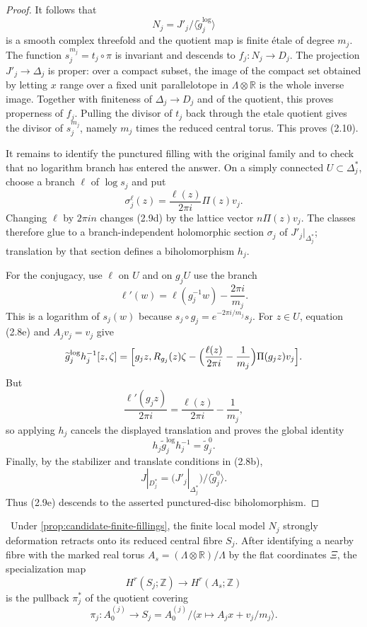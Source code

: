 \begin{proof}
It follows that
\[
 N_j=J'_j/\langle\widetilde g_j^{\log}\rangle
\]
is a smooth complex threefold and the quotient map is finite \'etale of
degree \(m_j\).  The function \(s_j^{m_j}=t_j\circ\pi\) is invariant and
descends to \(f_j:N_j\to D_j\).  The projection
\(J'_j\to\Delta_j\) is proper: over a compact subset, the image of the
compact set obtained by letting \(x\) range over a fixed unit
parallelotope in \(\Lambda\otimes\mathbb R\) is the whole inverse image.
Together with finiteness of \(\Delta_j\to D_j\) and of the quotient, this
proves properness of \(f_j\).  Pulling the divisor of \(t_j\) back through
the etale quotient gives the divisor of \(s_j^{m_j}\), namely \(m_j\)
times the reduced central torus.  This proves (2.10).

It remains to identify the punctured filling with the original family and
to check that no logarithm branch has entered the answer.  On a simply
connected \(U\subset\Delta_j^*\), choose a branch \(\ell\) of
\(\log s_j\) and put
\[
 \sigma_j^\ell(z)=\frac{\ell(z)}{2\pi i}\Pi(z)v_j.
 \tag{2.9d}
\]
Changing \(\ell\) by \(2\pi in\) changes (2.9d) by the lattice vector
\(n\Pi(z)v_j\).  The classes therefore glue to a branch-independent
holomorphic section \(\sigma_j\) of \(J'_j|_{\Delta_j^*}\); translation by
that section defines a biholomorphism \(h_j\).

For the conjugacy, use \(\ell\) on \(U\) and on \(g_jU\) use the branch
\[
 \ell'(w)=\ell(g_j^{-1}w)-\frac{2\pi i}{m_j}.
\]
This is a logarithm of \(s_j(w)\) because
\(s_j\circ g_j=e^{-2\pi i/m_j}s_j\).  For \(z\in U\), equation (2.8e)
and \(A_jv_j=v_j\) give
\[
\begin{aligned}
 \widetilde g_j^{\log}h_j^{-1}[z,\zeta]
  =\Bigl[g_jz,R_{g_j}(z)\zeta
  -\Bigl(\frac{\ell(z)}{2\pi i}-\frac1{m_j}\Bigr)
    \Pi(g_jz)v_j\Bigr].
\end{aligned}
\]
But
\[
 \frac{\ell'(g_jz)}{2\pi i}
 =\frac{\ell(z)}{2\pi i}-\frac1{m_j},
\]
so applying \(h_j\) cancels the displayed translation and proves the
global identity
\[
 h_j\widetilde g_j^{\log}h_j^{-1}=\widetilde g_j^{0}.
 \tag{2.9e}
\]
Finally, by the stabilizer and translate conditions in (2.8b),
\[
 J|_{D_j^*}
 =\bigl(J'_j|_{\Delta_j^*}\bigr)/
   \langle\widetilde g_j^{0}\rangle.
\]
Thus (2.9e) descends to the asserted punctured-disc biholomorphism.
\end{proof}

\begin{lemma}
\label{lem:finite-filling-stalk-map}
\Verified\ Under \cref{prop:candidate-finite-fillings}, the finite local
model \(N_j\) strongly deformation retracts onto its reduced central fibre
\(S_j\).  After identifying a nearby fibre with the marked real torus
\(A_s=(\Lambda\otimes\mathbb R)/\Lambda\) by the flat coordinates
\(\Xi\), the specialization map
\[
 H^r(S_j;\mathbb Z)\longrightarrow H^r(A_s;\mathbb Z)
\]
is the pullback \(\pi_j^*\) of the quotient covering
\[
 \pi_j:A_0^{(j)}\longrightarrow
 S_j=A_0^{(j)}/\langle x\mapsto A_jx+v_j/m_j\rangle .
\]
\end{lemma}

